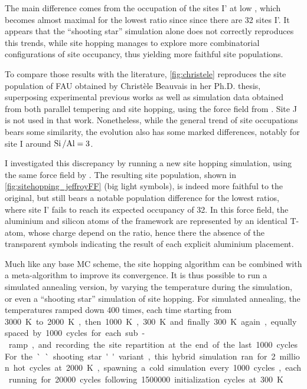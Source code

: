 \documentclass[main.tex]{subfiles}
\begin{document}
The main difference comes from the occupation of the sites I' at low \SiAl, which becomes almost maximal for the lowest ratio since since there are 32 sites I'. It appears that the ``shooting star'' simulation alone does not correctly reproduces this trends, while site hopping manages to explore more combinatorial configurations of site occupancy, thus yielding more faithful site populations.

To compare those results with the literature, \cref{fig:christele} reproduces the site population of FAU obtained by Christèle Beauvais in her Ph.D. thesis, superposing experimental previous works as well as simulation data obtained from both parallel tempering and site hopping, using the force field from \textcite{DiLellaFF}. Site J is not used in that work. Nonetheless, while the general trend of site occupations bears some similarity, the evolution also has some marked differences, notably for site I around $\mbox{Si\,/Al} = 3$.

I investigated this discrepancy by running a new site hopping simulation, using the same force field by \textcite{DiLellaFF}. The resulting site population, shown in \cref{fig:sitehopping_jeffroyFF} (big light symbols), is indeed more faithful to the original, but still bears a notable population difference for the lowest \SiAl ratios, where site I' fails to reach its expected occupancy of 32. In this force field, the aluminium and silicon atoms of the framework are represented by an identical T-atom, whose charge depend on the \SiAl ratio, hence there the absence of the transparent symbols indicating the result of each explicit aluminium placement.

Much like any base MC scheme, the site hopping algorithm can be combined with a meta-algorithm to improve its convergence. It is thus possible to run a simulated annealing version, by varying the temperature during the simulation, or even a ``shooting star'' simulation of site hopping. For simulated annealing, the temperatures ramped down \num{400} times, each time starting from \qty{3000}K to \qty{2000}K, then \qty{1000}K, \qty{300}K and finally \qty{300}K again, equally spaced by \num{1000} cycles for each sub-ramp, and recording the site repartition at the end of the last \num{1000} cycles. For the ``shooting star'' variant, this hybrid simulation ran for 2 million hot cycles at \qty{2000}K, spawning a cold simulation every \num{1000} cycles, each running for \num{20000} cycles following \num{1500000} initialization cycles at \qty{300}K.\label{sitehopping_simulatedannealing}
\end{document}
